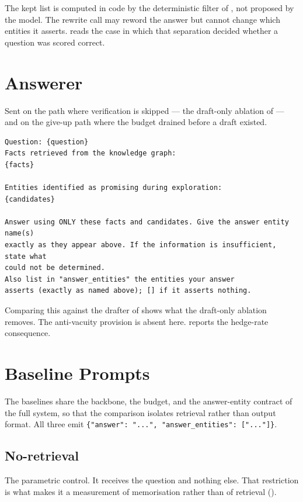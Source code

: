 The kept list is computed in code by the deterministic filter of
, not proposed by the model. The rewrite call may
reword the answer but cannot change which entities it asserts.
 reads the case in which that separation decided
whether a question was scored correct.

\section{Answerer}\label{app:prompt-answer}

Sent on the path where verification is skipped --- the draft-only ablation
of  --- and on the give-up path where the budget drained
before a draft existed.

\begin{lstlisting}[style=verbatimblock]
Question: {question}
Facts retrieved from the knowledge graph:
{facts}

Entities identified as promising during exploration:
{candidates}

Answer using ONLY these facts and candidates. Give the answer entity name(s)
exactly as they appear above. If the information is insufficient, state what
could not be determined.
Also list in "answer_entities" the entities your answer
asserts (exactly as named above); [] if it asserts nothing.
\end{lstlisting}

Comparing this against the drafter of  shows what the
draft-only ablation removes. The anti-vacuity provision is absent here.
 reports the hedge-rate consequence.

\section{Baseline Prompts}\label{app:prompt-baselines}

The baselines share the backbone, the budget, and the answer-entity contract of
the full system, so that the comparison isolates retrieval rather than output
format. All three emit \verb|{"answer": "...", "answer_entities": ["..."]}|.

\subsection*{No-retrieval}

The parametric control. It receives the question and nothing else. That
restriction is what makes it a measurement of memorisation rather than of
retrieval ().

